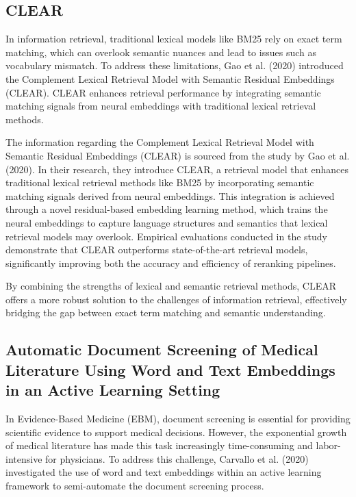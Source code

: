 
\subsection{CLEAR}

\noindent In information retrieval, traditional lexical models like BM25 rely on exact term matching, which can overlook semantic nuances and lead to issues such as vocabulary mismatch. To address these limitations, Gao et al. (2020) introduced the Complement Lexical Retrieval Model with Semantic Residual Embeddings (CLEAR). CLEAR enhances retrieval performance by integrating semantic matching signals from neural embeddings with traditional lexical retrieval methods.

The information regarding the Complement Lexical Retrieval Model with Semantic Residual Embeddings (CLEAR) is sourced from the study by Gao et al. (2020). In their research, they introduce CLEAR, a retrieval model that enhances traditional lexical retrieval methods like BM25 by incorporating semantic matching signals derived from neural embeddings. This integration is achieved through a novel residual-based embedding learning method, which trains the neural embeddings to capture language structures and semantics that lexical retrieval models may overlook. Empirical evaluations conducted in the study demonstrate that CLEAR outperforms state-of-the-art retrieval models, significantly improving both the accuracy and efficiency of reranking pipelines.

By combining the strengths of lexical and semantic retrieval methods, CLEAR offers a more robust solution to the challenges of information retrieval, effectively bridging the gap between exact term matching and semantic understanding.


\subsection{Automatic Document Screening of Medical Literature Using Word and Text Embeddings in an Active Learning Setting}

\noindent In Evidence-Based Medicine (EBM), document screening is essential for providing scientific evidence to support medical decisions. However, the exponential growth of medical literature has made this task increasingly time-consuming and labor-intensive for physicians. To address this challenge, Carvallo et al. (2020) investigated the use of word and text embeddings within an active learning framework to semi-automate the document screening process.

